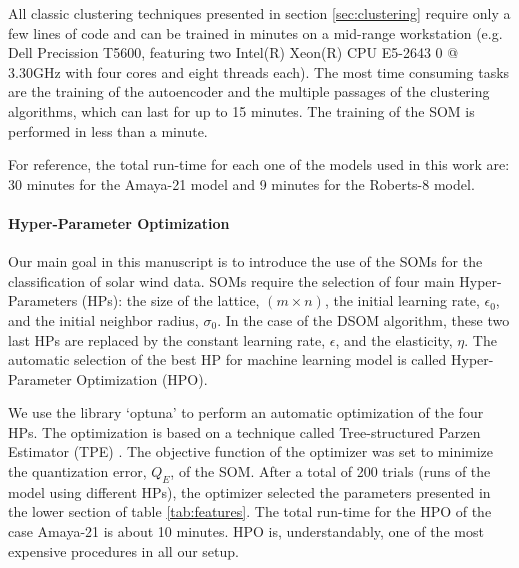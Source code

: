 All classic clustering techniques presented in section \ref{sec:clustering} require only a few lines of code and can be trained in minutes on a mid-range workstation (e.g. Dell Precission T5600, featuring two Intel(R) Xeon(R) CPU E5-2643 0 @ 3.30GHz with four cores and eight threads each). The most time consuming tasks are the training of the autoencoder and the multiple passages of the clustering algorithms, which can last for up to 15 minutes. The training of the SOM is performed in less than a minute.

For reference, the total run-time for each one of the models used in this work are: 30 minutes for the Amaya-21 model and 9 minutes for the Roberts-8 model.

\paragraph{Hyper-Parameter Optimization}
Our main goal in this manuscript is to introduce the use of the SOMs for the classification of solar wind data. SOMs require the selection of four main Hyper-Parameters (HPs): the size of the lattice, $(m\times n)$, the initial learning rate, $\epsilon_0$, and the initial neighbor radius, $\sigma_0$. In the case of the DSOM algorithm, these two last HPs are replaced by the constant learning rate, $\epsilon$, and the elasticity, $\eta$. The automatic selection of the best HP for machine learning model is called Hyper-Parameter Optimization (HPO).

We use the library `optuna' \citep{Akiba2019} to perform an automatic optimization of the four HPs. The optimization is based on a technique called Tree-structured Parzen Estimator (TPE) \citep{pmlr-v28-bergstra13}. The objective function of the optimizer was set to minimize the quantization error, $Q_E$, of the SOM. After a total of 200 trials (runs of the model using different HPs), the optimizer selected the parameters presented in the lower section of table \ref{tab:features}. The total run-time for the HPO of the case Amaya-21 is about 10 minutes. HPO is, understandably, one of the most expensive procedures in all our setup.